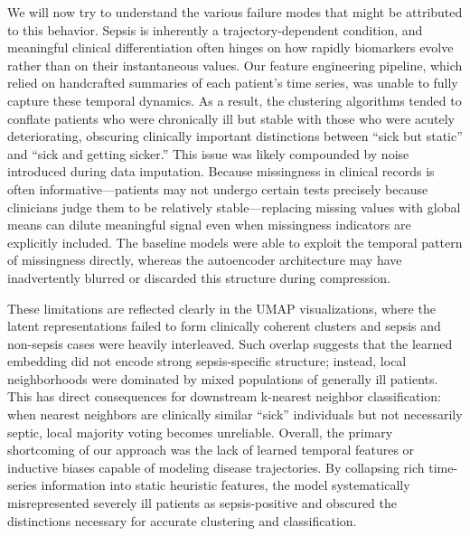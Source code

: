 \documentclass{article}
\theoremstyle{plain}
\theoremstyle{definition}
\theoremstyle{remark}
\begin{document}
\begin{table}[H]
\centering
{}
\end{table}

We will now try to understand the various failure modes that might be attributed to this behavior. Sepsis is inherently a trajectory-dependent condition, and meaningful clinical differentiation often hinges on how rapidly biomarkers evolve rather than on their instantaneous values. Our feature engineering pipeline, which relied on handcrafted summaries of each patient’s time series, was unable to fully capture these temporal dynamics. As a result, the clustering algorithms tended to conflate patients who were chronically ill but stable with those who were acutely deteriorating, obscuring clinically important distinctions between “sick but static” and “sick and getting sicker.” This issue was likely compounded by noise introduced during data imputation. Because missingness in clinical records is often informative—patients may not undergo certain tests precisely because clinicians judge them to be relatively stable—replacing missing values with global means can dilute meaningful signal even when missingness indicators are explicitly included. The baseline models were able to exploit the temporal pattern of missingness directly, whereas the autoencoder architecture may have inadvertently blurred or discarded this structure during compression.

These limitations are reflected clearly in the UMAP visualizations, where the latent representations failed to form clinically coherent clusters and sepsis and non-sepsis cases were heavily interleaved. Such overlap suggests that the learned embedding did not encode strong sepsis-specific structure; instead, local neighborhoods were dominated by mixed populations of generally ill patients. This has direct consequences for downstream k-nearest neighbor classification: when nearest neighbors are clinically similar “sick” individuals but not necessarily septic, local majority voting becomes unreliable. Overall, the primary shortcoming of our approach was the lack of learned temporal features or inductive biases capable of modeling disease trajectories. By collapsing rich time-series information into static heuristic features, the model systematically misrepresented severely ill patients as sepsis-positive and obscured the distinctions necessary for accurate clustering and classification.
\end{document}
